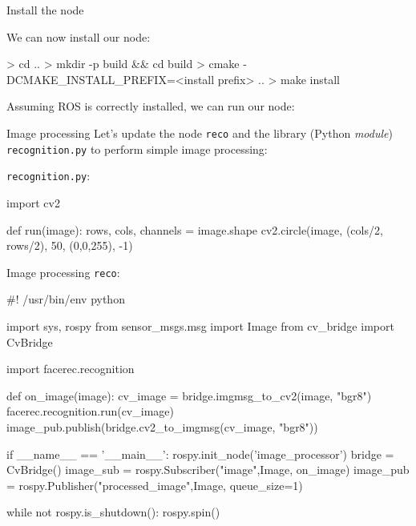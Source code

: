 \documentclass[compress]{beamer}
\begin{document}
\begin{frame}[fragile]{Install the node}

    We can now install our node:

\begin{shcode}
> cd ..
> mkdir -p build && cd build
> cmake -DCMAKE_INSTALL_PREFIX=<install prefix> ..
> make install
\end{shcode}

\pause

Assuming ROS is correctly installed, we can run our node:



\end{frame}

\begin{frame}[fragile]{Image processing}
Let's update the node \texttt{reco} and the library (Python \emph{module})
    \texttt{recognition.py} to perform simple image processing:

\texttt{recognition.py}:
\begin{pythoncode}
import cv2

def run(image):
    rows, cols, channels = image.shape
    cv2.circle(image, (cols/2, rows/2), 50, (0,0,255), -1)
\end{pythoncode}
\end{frame}

\begin{frame}[fragile]{Image processing}
\texttt{reco}:
\begin{pythoncode}
#! /usr/bin/env python

import sys, rospy
from sensor_msgs.msg import Image
from cv_bridge import CvBridge

import facerec.recognition

def on_image(image):
    cv_image = bridge.imgmsg_to_cv2(image, "bgr8")
    facerec.recognition.run(cv_image)
    image_pub.publish(bridge.cv2_to_imgmsg(cv_image, "bgr8"))

if __name__ == '__main__':
    rospy.init_node('image_processor')
    bridge = CvBridge()
    image_sub = rospy.Subscriber("image",Image, on_image)
    image_pub = rospy.Publisher("processed_image",Image, queue_size=1)

    while not rospy.is_shutdown():
        rospy.spin()
\end{pythoncode}

\end{frame}
\end{document}
